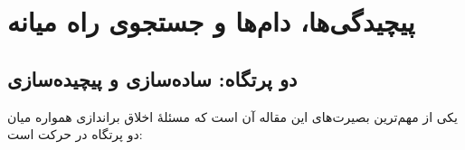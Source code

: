 
\newpage
\section{پیچیدگی‌ها، دام‌ها و جستجوی راه میانه}

\subsection{دو پرتگاه: ساده‌سازی و پیچیده‌سازی}

یکی از مهم‌ترین بصیرت‌های این مقاله آن است که مسئلهٔ اخلاق براندازی 
همواره میان دو پرتگاه در حرکت است:


